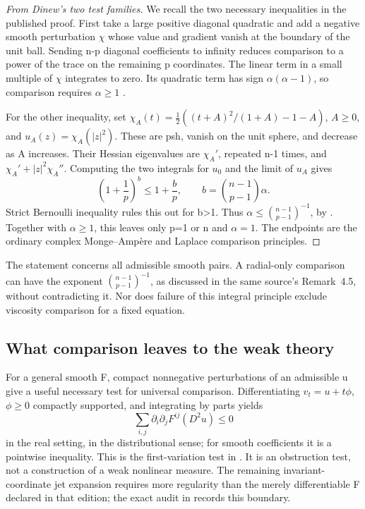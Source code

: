 \begin{proof}[From Dinew's two test families]
We recall the two necessary inequalities in the published proof.
First take a large positive diagonal quadratic and add a negative
smooth perturbation \(\chi\) whose value and gradient vanish at
the boundary of the unit ball. Sending n-p diagonal coefficients
to infinity reduces comparison to a power of the trace on the
remaining p coordinates. The linear term in a small multiple of
\(\chi\) integrates to zero. Its quadratic term has sign
\(\alpha(\alpha-1)\), so comparison requires \(\alpha\geq1\)
\cite[Claim~4.3, pp.~1005--1006]{Dinew22SadullaevPublished}.

For the other inequality, set
\(\chi_A(t)=\tfrac12((t+A)^2/(1+A)-1-A)\), \(A\geq0\),
and \(u_A(z)=\chi_A(|z|^2)\). These are psh, vanish on the
unit sphere, and decrease as A increases. Their Hessian eigenvalues
are \(\chi_A'\), repeated n-1 times, and
\(\chi_A'+|z|^2\chi_A''\). Computing the two integrals for
\(u_0\) and the limit of \(u_A\) gives
\[
 \tag{H.14}\label{eq:appH-Dinew-exponent-test}
 \left(1+\frac1p\right)^b\leq1+\frac bp,
 \qquad b=\binom{n-1}{p-1}\alpha.
\]
Strict Bernoulli inequality rules this out for b>1. Thus
\(\alpha\leq\binom{n-1}{p-1}^{-1}\), by
\cite[Claim~4.4, pp.~1006--1007]{Dinew22SadullaevPublished}.
Together with \(\alpha\geq1\), this leaves only p=1 or n
and \(\alpha=1\). The endpoints are the ordinary complex
Monge--Amp\`ere and Laplace comparison principles.
\end{proof}

The statement concerns all admissible smooth pairs. A radial-only
comparison can have the exponent
\(\binom{n-1}{p-1}^{-1}\), as discussed in the same source's
Remark~4.5, without contradicting it. Nor does failure of this
integral principle exclude viscosity comparison for a fixed equation.

\subsection{What comparison leaves to the weak theory}
\label{sec:appH-smooth-comparison-weak-boundary}

For a general smooth F, compact nonnegative perturbations of an
admissible u give a useful necessary test for universal comparison.
Differentiating \(v_t=u+t\phi\), \(\phi\geq0\) compactly supported,
and integrating by parts yields
\[
 \tag{H.15}\label{eq:appH-comparison-adjoint-test}
 \sum_{i,j}\partial_i\partial_jF^{ij}(D^2u)\leq0
\]
in the real setting, in the distributional sense; for smooth
coefficients it is a pointwise inequality. This is the first-variation
test in \cite[(3.3)--(3.6)]{DinewMygaSroka26IntegralV1}.
It is an obstruction test, not a construction of a weak nonlinear
measure. The remaining invariant-coordinate jet expansion requires
more regularity than the merely differentiable F declared in that
edition; the exact audit in
 records this boundary.

